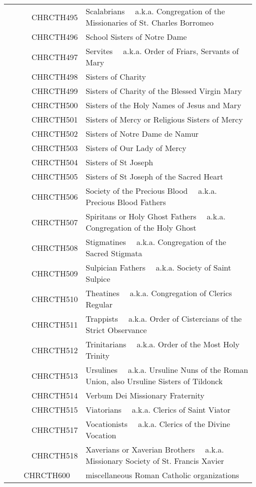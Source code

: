\documentclass[12pt]{article}
\begin{document}
\begin{tiny}
\begin{center}
\begin{longtable}{|l|l|}
~~~~~~CHRCTH495 & Scalabrians 	~~a.k.a. Congregation of the Missionaries of St. Charles Borromeo \\
~~~~~~CHRCTH496 & School Sisters of Notre Dame \\
~~~~~~CHRCTH497 & Servites 	~~a.k.a. Order of Friars, Servants of Mary \\
~~~~~~CHRCTH498 & Sisters of Charity \\
~~~~~~CHRCTH499 & Sisters of Charity of the Blessed Virgin Mary \\
~~~~~~CHRCTH500 & Sisters of the Holy Names of Jesus and Mary \\
~~~~~~CHRCTH501 & Sisters of Mercy or Religious Sisters of Mercy \\
~~~~~~CHRCTH502 & Sisters of Notre Dame de Namur \\
~~~~~~CHRCTH503 & Sisters of Our Lady of Mercy \\
~~~~~~CHRCTH504 & Sisters of St Joseph \\
~~~~~~CHRCTH505 & Sisters of St Joseph of the Sacred Heart \\
~~~~~~CHRCTH506 & Society of the Precious Blood 	~~a.k.a. Precious Blood Fathers \\
~~~~~~CHRCTH507 & Spiritans or Holy Ghost Fathers 	~~a.k.a. Congregation of the Holy Ghost \\
~~~~~~CHRCTH508 & Stigmatines 	~~a.k.a. Congregation of the Sacred Stigmata \\
~~~~~~CHRCTH509 & Sulpician Fathers 	~~a.k.a. Society of Saint Sulpice \\
~~~~~~CHRCTH510 & Theatines 	~~a.k.a. Congregation of Clerics Regular \\
~~~~~~CHRCTH511 & Trappists 	~~a.k.a. Order of Cistercians of the Strict Observance \\
~~~~~~CHRCTH512 & Trinitarians 	~~a.k.a. Order of the Most Holy Trinity \\
~~~~~~CHRCTH513 & Ursulines 	~~a.k.a. Ursuline Nuns of the Roman Union, also Ursuline Sisters of Tildonck \\
~~~~~~CHRCTH514 & Verbum Dei Missionary Fraternity \\
~~~~~~CHRCTH515 & Viatorians 	~~a.k.a. Clerics of Saint Viator \\
~~~~~~CHRCTH517 & Vocationists 	~~a.k.a. Clerics of the Divine Vocation \\
~~~~~~CHRCTH518 & Xaverians or Xaverian Brothers 	~~a.k.a. Missionary Society of St. Francis Xavier \\
~~~~CHRCTH600 & miscellaneous Roman Catholic organizations \\

\end{longtable}
\end{center}
\end{tiny}
\end{document}
